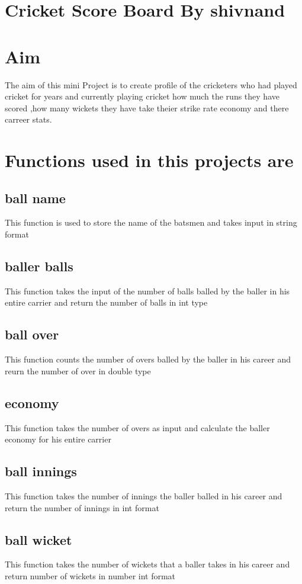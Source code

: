 \documentclass{article}
\begin{document}
\pagestyle{fancy}
\section{Cricket Score Board By shivnand}
\section{Aim}
 The aim of this mini Project is to create profile of the cricketers who had played cricket for years and currently playing cricket how much the runs they have scored ,how many wickets they have take theier strike rate economy and there carreer stats.
\section{Functions used in this projects are}
\subsection{ball name}
This function is used to store the name of the batsmen and takes input in string format
\subsection{baller balls}
This function takes the input of the number of balls balled by the baller in his entire carrier and return the number of balls in int type
\subsection{ball over}
This function counts the number of overs balled by the baller in his career and reurn the number of over in double type
\subsection{economy}
This function takes the number of overs as input and calculate the baller economy for his entire carrier
\subsection{ball innings}
This function takes the number of innings the baller balled in his career and return the number of innings in int format
\subsection{ball wicket}
This function takes the number of wickets that a baller takes in his career and return number of wickets in number int format
\end{document}
